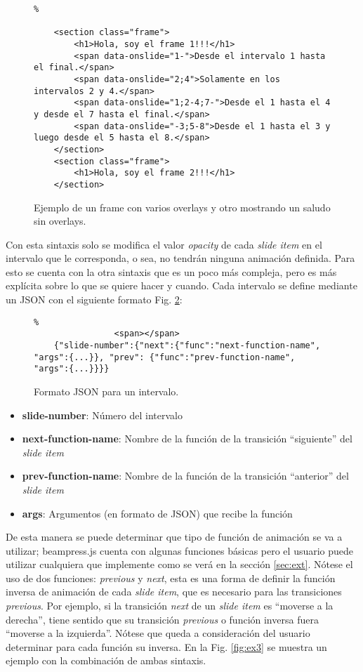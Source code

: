 			\begin{figure}[htb]%
				\begin{lstlisting}%

	<section class="frame">
		<h1>Hola, soy el frame 1!!!</h1>
	    <span data-onslide="1-">Desde el intervalo 1 hasta el final.</span>
	    <span data-onslide="2;4">Solamente en los intervalos 2 y 4.</span>
	    <span data-onslide="1;2-4;7-">Desde el 1 hasta el 4 y desde el 7 hasta el final.</span>
	    <span data-onslide="-3;5-8">Desde el 1 hasta el 3 y luego desde el 5 hasta el 8.</span>
	</section>
	<section class="frame">
		<h1>Hola, soy el frame 2!!!</h1>
	</section>
				\end{lstlisting}
			\caption{Ejemplo de un frame con varios overlays y otro mostrando un saludo sin overlays. \label{fig:ex1}}
			\end{figure}

		Con esta sintaxis solo se modifica el valor \textit{opacity} de cada \textit{slide item} en el intervalo que le corresponda, o sea, no tendrán ninguna animación definida. Para esto se cuenta con la otra sintaxis que es un poco más compleja, pero es más explícita sobre lo que se quiere hacer y cuando. Cada intervalo se define mediante un JSON con el siguiente formato Fig. \ref{fig:ex2}:

			\begin{figure}[htb]%
				\begin{lstlisting}%
				<span></span>
	{"slide-number":{"next":{"func":"next-function-name", "args":{...}}, "prev": {"func":"prev-function-name", "args":{...}}}}		
				\end{lstlisting}
			\caption{
				Formato JSON para un intervalo. 
				\label{fig:ex2} }
			\end{figure}

			\begin{itemize}
				\item \textbf{slide-number}: Número del intervalo
				\item \textbf{next-function-name}: Nombre de la función de la transición ``siguiente'' del \textit{slide item}
				\item \textbf{prev-function-name}: Nombre de la función de la transición ``anterior'' del \textit{slide item}			 	
				\item \textbf{args}: Argumentos (en formato de JSON) que recibe la función  
			\end{itemize}


		De esta manera se puede determinar que tipo de función de animación se va a utilizar; beampress.js cuenta con algunas funciones básicas pero el usuario puede utilizar cualquiera que implemente como se verá en la sección \ref{sec:ext}. Nótese el uso de dos funciones: \textit{previous} y \textit{next}, esta es una forma de definir la función inversa de animación de cada \textit{slide item}, que es necesario para las transiciones \textit{previous}. Por ejemplo, si la transición \textit{next} de un \textit{slide item} es ``moverse a la derecha'', tiene sentido que su transición \textit{previous} o función inversa fuera ``moverse a la izquierda''. Nótese que queda a consideración del usuario determinar para cada función su inversa. En la Fig. \ref{fig:ex3} se muestra un ejemplo con la combinación de ambas sintaxis.

